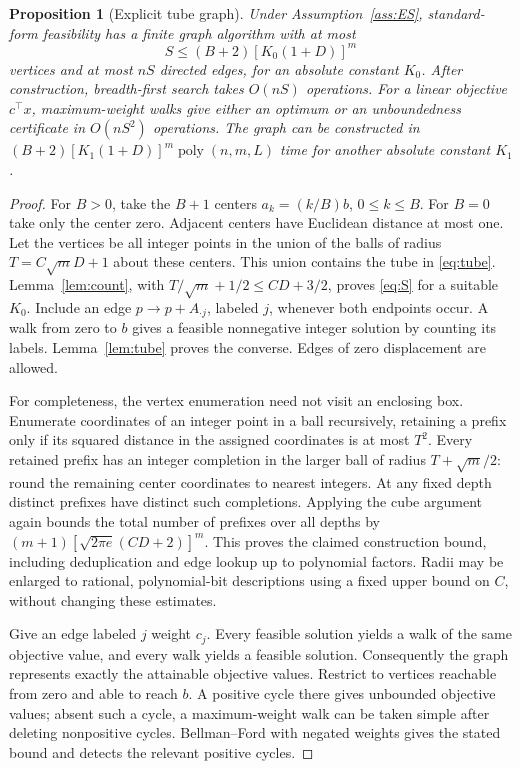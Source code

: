 \documentclass[11pt]{article}
\newtheorem{proposition}[theorem]{Proposition}
\theoremstyle{definition}
\theoremstyle{remark}
\newcommand{\poly}{\operatorname{poly}}
\begin{document}
\begin{proposition}[Explicit tube graph]\label{prop:tubegraph}
Under Assumption~\ref{ass:ES}, standard-form feasibility has a finite
graph algorithm with at most
\[
 S\le (B+2)[K_0(1+D)]^m
 \tag{8}\label{eq:S}
\]
vertices and at most $nS$ directed edges, for an absolute constant $K_0$.
After construction, breadth-first search takes $O(nS)$ operations.
For a linear objective $c^\top x$, maximum-weight walks give either an
optimum or an unboundedness certificate in $O(nS^2)$ operations.
The graph can be constructed in $(B+2)[K_1(1+D)]^m\poly(n,m,L)$ time
for another absolute constant $K_1$.
\end{proposition}
\begin{proof}
For $B>0$, take the $B+1$ centers $a_k=(k/B)b$, $0\le k\le B$.
For $B=0$ take only the center zero. Adjacent centers have Euclidean
distance at most one. Let the vertices be all integer points in the
union of the balls of radius $T=C\sqrt m D+1$ about these centers.
This union contains the tube in \eqref{eq:tube}.
Lemma~\ref{lem:count}, with
$T/\sqrt m+1/2\le CD+3/2$, proves \eqref{eq:S} for a suitable $K_0$.
Include an edge $p\longrightarrow p+A_{\cdot j}$, labeled $j$, whenever
both endpoints occur. A walk from zero to $b$ gives a feasible nonnegative
integer solution by counting its labels. Lemma~\ref{lem:tube} proves
the converse. Edges of zero displacement are allowed.

For completeness, the vertex enumeration need not visit an enclosing
box. Enumerate coordinates of an integer point in a ball recursively,
retaining a prefix only if its squared distance in the assigned
coordinates is at most $T^2$. Every retained prefix has an integer
completion in the larger ball of radius $T+\sqrt m/2$: round the remaining
center coordinates to nearest integers. At any fixed depth distinct
prefixes have distinct such completions. Applying the cube argument
again bounds the total number of prefixes over all depths by
$(m+1)[\sqrt{2\pi e}(CD+2)]^m$. This proves the claimed construction
bound, including deduplication and edge lookup up to polynomial factors.
Radii may be enlarged to rational, polynomial-bit descriptions using a
fixed upper bound on $C$, without changing these estimates.

Give an edge labeled $j$ weight $c_j$. Every feasible solution yields a
walk of the same objective value, and every walk yields a feasible solution.
Consequently the graph represents exactly the attainable objective values.
Restrict to vertices reachable from zero and able to reach $b$. A positive
cycle there gives unbounded objective values; absent such a cycle, a
maximum-weight walk can be taken simple after deleting nonpositive
cycles. Bellman--Ford with negated weights gives the stated bound and
detects the relevant positive cycles.
\end{proof}
\end{document}
